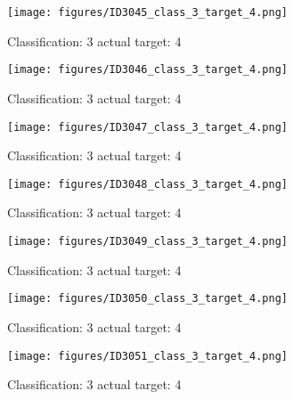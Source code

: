 \begin{figure}[h!]
\begin{center}
\texttt{[image: figures/ID3045\_class\_3\_target\_4.png]}
\end{center}
\caption{ Classification: 3 actual target: 4}
\label{fig:ID3045_class_3_target_4}
\end{figure}
\begin{figure}[h!]
\begin{center}
\texttt{[image: figures/ID3046\_class\_3\_target\_4.png]}
\end{center}
\caption{ Classification: 3 actual target: 4}
\label{fig:ID3046_class_3_target_4}
\end{figure}
\begin{figure}[h!]
\begin{center}
\texttt{[image: figures/ID3047\_class\_3\_target\_4.png]}
\end{center}
\caption{ Classification: 3 actual target: 4}
\label{fig:ID3047_class_3_target_4}
\end{figure}
\begin{figure}[h!]
\begin{center}
\texttt{[image: figures/ID3048\_class\_3\_target\_4.png]}
\end{center}
\caption{ Classification: 3 actual target: 4}
\label{fig:ID3048_class_3_target_4}
\end{figure}
\begin{figure}[h!]
\begin{center}
\texttt{[image: figures/ID3049\_class\_3\_target\_4.png]}
\end{center}
\caption{ Classification: 3 actual target: 4}
\label{fig:ID3049_class_3_target_4}
\end{figure}
\begin{figure}[h!]
\begin{center}
\texttt{[image: figures/ID3050\_class\_3\_target\_4.png]}
\end{center}
\caption{ Classification: 3 actual target: 4}
\label{fig:ID3050_class_3_target_4}
\end{figure}
\begin{figure}[h!]
\begin{center}
\texttt{[image: figures/ID3051\_class\_3\_target\_4.png]}
\end{center}
\caption{ Classification: 3 actual target: 4}
\label{fig:ID3051_class_3_target_4}
\end{figure}
